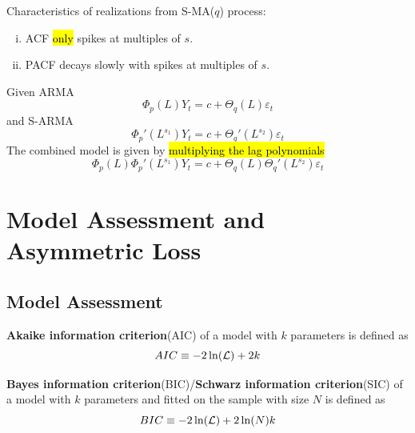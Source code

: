 \documentclass[11pt]{article}
\begin{document}
				\begin{remark}
					Characteristics of realizations from S-MA($q$) process:
					\begin{enumerate}[(i)]
						\item ACF \hl{only} spikes at multiples of $s$.
						\item PACF decays slowly with spikes at multiples of $s$.
					\end{enumerate}
				\end{remark}
				
				\begin{proposition}
					Given ARMA 
					\begin{equation}
						\Phi_p(L) Y_t = c + \Theta_q(L) \varepsilon_t
					\end{equation}
					and S-ARMA
					\begin{equation}
						\Phi_p'(L^{s_1}) Y_t = c + \Theta_q'(L^{s_2}) \varepsilon_t
					\end{equation}
					The combined model is given by \hl{multiplying the lag polynomials}
					\begin{equation}
						\Phi_p(L) \Phi_p'(L^{s_1}) Y_t = c +  \Theta_q(L) \Theta_q'(L^{s_2}) \varepsilon_t
					\end{equation}
				\end{proposition}
	\section{Model Assessment and Asymmetric Loss}
		\subsection{Model Assessment}
			\begin{definition}
				\textbf{Akaike information criterion}(AIC) of a model with $k$ parameters is defined as
				\begin{equation}
					AIC \equiv -2 \ln(\mathcal{{L}}) + 2k
				\end{equation}
			\end{definition}
			
			\begin{definition}
				\textbf{Bayes information criterion}(BIC)/\textbf{Schwarz information criterion}(SIC) of a model with $k$ parameters and fitted on the sample with size $N$ is defined as
				\begin{equation}
					BIC \equiv -2 \ln(\mathcal{{L}}) + 2 \ln(N) k
				\end{equation}
			\end{definition}
			
\end{document}
